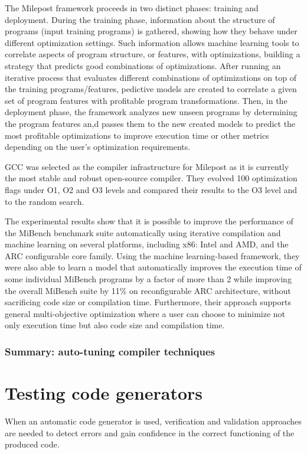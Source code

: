 The Milepost framework proceeds in two distinct phases: training and deployment. During the training phase, information about the structure of programs (input training programs) is gathered, showing how they behave under different optimization settings. Such information allows machine learning tools to correlate aspects of program structure, or features, with optimizations, building a strategy that predicts good combinations of optimizations. 
After running an iterative process that evaluates different combinations of optimizations on top of the training programs/features, pedictive models are created to correlate a given set of program features with profitable program transformations. 
Then, in the deployment phase, the framework analyzes new unseen programs by determining the program features an,d passes them to the new created models to predict the most profitable optimizations to improve execution time or other metrics depending on the user’s optimization requirements.

GCC was selected as the compiler infrastructure for Milepost as it is currently the most stable and robust open-source compiler. They evolved 100 optimization flags under O1, O2 and O3 levels and compared their results to the O3 level and to the random search.

The experimental results show that it is possible to improve the performance of the MiBench benchmark suite automatically using iterative compilation and machine learning on several platforms, including x86: Intel and AMD, and the ARC configurable core family. Using the machine learning-based framework, they were also able to learn a model that automatically improves the execution time of some individual MiBench programs by a factor of more than 2 while improving the overall MiBench suite by 11\% on reconfigurable ARC architecture, without sacrificing code size or compilation time. Furthermore, their approach supports general multi-objective optimization where a user can choose to minimize not only execution time but also code size and compilation time.



\subsubsection{Summary: auto-tuning compiler techniques}
 


\section{Testing code generators}
When an automatic code generator is used, verification and validation approaches are needed to detect errors and gain confidence in the correct functioning of the produced code. 
